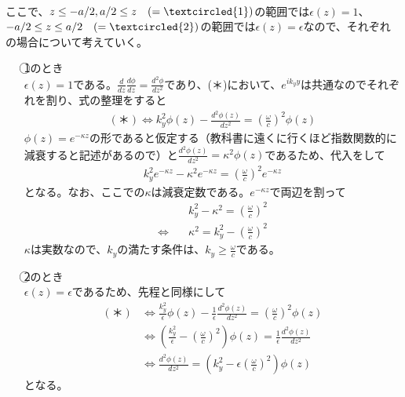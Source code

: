 \documentclass[a4paper,11pt,dvipdfmx]{jsarticle}
\begin{document}
\begin{enumerate}
\begin{align*}
    \end{align*}
    ここで、$z \leq - a / 2 , a / 2 \leq z \quad (=\textcircled{\scriptsize 1})$の範囲では$\epsilon(z) = 1$、$-a / 2 \leq z \leq a / 2 \quad (=\textcircled{\scriptsize 2})$の範囲では$\epsilon(z) = \epsilon$なので、それぞれの場合について考えていく。
    \begin{enumerate}
      \item[\textcircled{\scriptsize 1}のとき] \quad \\
      $\epsilon(z) = 1$である。$\displaystyle \frac{d}{dz}\frac{d \phi}{dz} = \frac{d^2\phi}{dz^2}$であり、(＊)において、$e^{ik_y y}$は共通なのでそれぞれを割り、式の整理をすると
      \begin{align*}
        (＊) \Longleftrightarrow k_y^2 \phi(z) - \frac{d^2 \phi(z)}{dz^2} = \left( \frac{\omega}{c} \right)^2 \phi(z)
      \end{align*}
      $\phi(z) = e^{- \kappa z}$の形であると仮定する（教科書に遠くに行くほど指数関数的に減衰すると記述があるので）と$\displaystyle \frac{d^2\phi(z)}{dz^2} = \kappa^2 \phi(z)$であるため、代入をして
      \begin{align*}
        k_y^2 e^{- \kappa z} - \kappa^2 e^{- \kappa z} = \left( \frac{\omega}{c} \right)^2 e^{-\kappa z}
      \end{align*}
      となる。なお、ここでの$\kappa$は減衰定数である。$e^{- \kappa z}$で両辺を割って
      \begin{align*}
        & k_y^2 - \kappa^2 = \left( \frac{\omega}{c} \right)^2
        \\
        \Longleftrightarrow \quad & \kappa^2 = k_y^2 - \left( \frac{\omega}{c} \right)^2
      \end{align*}
      $\kappa$は実数なので、$k_y$の満たす条件は、$k_y \geq \displaystyle \frac{\omega}{c}$である。
      \item[\textcircled{\scriptsize 2}のとき] \quad \\
      $\epsilon(z) = \epsilon$であるため、先程と同様にして
      \begin{align*}
        (＊) &\Longleftrightarrow \frac{k_y^2}{\epsilon} \phi(z) - \frac{1}{\epsilon} \frac{d^2 \phi(z)}{dz^2} = \left( \frac{\omega}{c} \right)^2 \phi(z) 
        \\
        &\Longleftrightarrow \left(  \frac{k_y^2}{\epsilon}  - \left( \frac{\omega}{c} \right)^2 \right) \phi(z) = \frac{1}{\epsilon} \frac{d^2 \phi(z)}{dz^2} 
        \\
        &\Longleftrightarrow \frac{d^2 \phi(z)}{dz^2} = \left( k_y^2  - \epsilon \left( \frac{\omega}{c} \right)^2 \right) \phi(z)
      \end{align*}
      となる。


\end{enumerate}
\end{enumerate}
\end{document}
